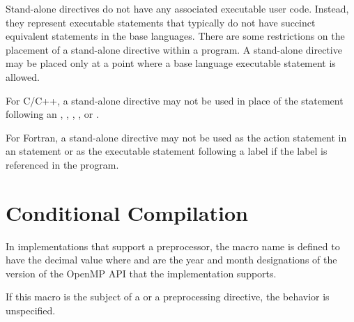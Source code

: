 \descr
Stand-alone directives do not have any associated executable user code. Instead, they
represent executable statements that typically do not have succinct equivalent statements
in the base languages. There are some restrictions on the placement of a stand-alone
directive within a program. A stand-alone directive may be placed only at a point where
a base language executable statement is allowed.

\restrictions
\begin{ccppspecific}
For C/C++, a stand-alone directive may not be used in place of the statement following
an , , , , or .
\end{ccppspecific}

\begin{fortranspecific}
For Fortran, a stand-alone directive may not be used as the action statement in an 
statement or as the executable statement following a label if the label is referenced in
the program.
\end{fortranspecific}


\section{Conditional Compilation}
\label{sec:Conditional Compilation}
In implementations that support a preprocessor, the  macro name is defined to
have the decimal value  where  and  are the year and month designations
of the version of the OpenMP API that the implementation supports.

If this macro is the subject of a  or a  preprocessing directive, the
behavior is unspecified.

